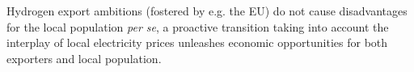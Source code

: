 Hydrogen export ambitions (fostered by e.g. the EU) do not cause disadvantages for the local population \textit{per se}, a proactive transition taking into account the interplay of local electricity prices unleashes economic opportunities for both exporters and local population.











